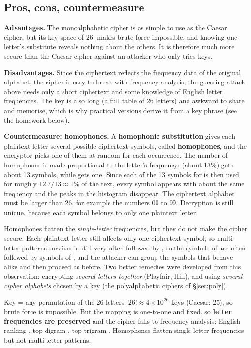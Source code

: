 \subsection{Pros, cons, countermeasure}
\textbf{Advantages.} The monoalphabetic cipher is as simple to use as the Caesar cipher, but its key space of $26!$ makes brute force impossible, and knowing one letter's substitute reveals nothing about the others. It is therefore much more secure than the Caesar cipher against an attacker who only tries keys.

\textbf{Disadvantages.} Since the ciphertext reflects the frequency data of the original alphabet, the cipher is easy to break with frequency analysis; the guessing attack above needs only a short ciphertext and some knowledge of English letter frequencies. The key is also long (a full table of 26 letters) and awkward to share and memorise, which is why practical versions derive it from a key phrase (see the homework below).

\textbf{Countermeasure: homophones.} A \textbf{homophonic substitution} gives each plaintext letter several possible ciphertext symbols, called \textbf{homophones}, and the encryptor picks one of them at random for each occurrence. The number of homophones is made proportional to the letter's frequency:  (about 13\%) gets about 13 symbols, while  gets one. Since each of the 13 symbols for  is then used for roughly $12.7/13 \approx 1\%$ of the text, every symbol appears with about the same frequency and the peaks in the histogram disappear. The ciphertext alphabet must be larger than 26, for example the numbers 00 to 99. Decryption is still unique, because each symbol belongs to only one plaintext letter.

Homophones flatten the \emph{single-letter} frequencies, but they do not make the cipher secure. Each plaintext letter still affects only one ciphertext symbol, so multi-letter patterns survive:  is still very often followed by , so the symbols of  are often followed by symbols of , and the attacker can group the symbols that behave alike and then proceed as before. Two better remedies were developed from this observation: encrypting \emph{several letters together} (Playfair, Hill), and using \emph{several cipher alphabets} chosen by a key (the polyalphabetic ciphers of \S\ref{sec:poly}).

\begin{mustknow}
Key = any permutation of the 26 letters: $26! \approx 4 \times 10^{26}$ keys (Caesar: 25), so brute force is impossible. But the mapping is one-to-one and fixed, so \textbf{letter frequencies are preserved} and the cipher falls to frequency analysis: English ranking , top digram , top trigram . Homophones flatten single-letter frequencies but not multi-letter patterns.
\end{mustknow}

